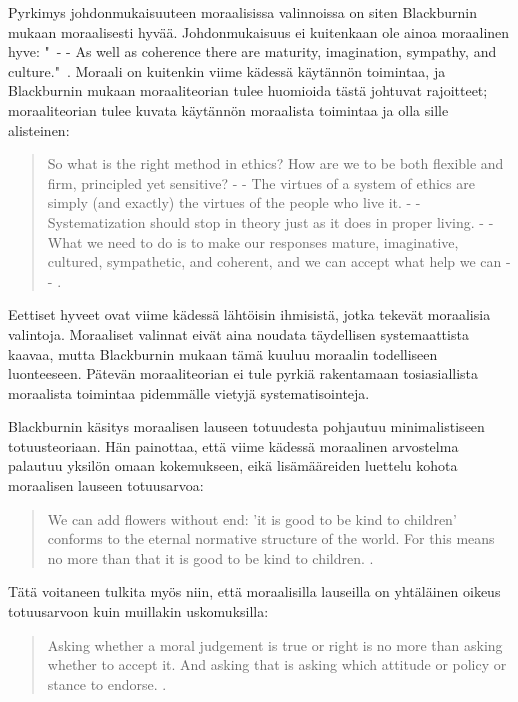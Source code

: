 \documentclass[a4paper,12pt,times,titlepage,finnish]{article}
\begin{document}
Pyrkimys johdonmukaisuuteen moraalisissa valinnoissa on siten Blackburnin mukaan moraalisesti hyvää. Johdonmukaisuus ei kuitenkaan ole ainoa moraalinen hyve: "\ - - As well as coherence there are maturity, imagination, sympathy, and culture."\ \citep[310]{Blackburn98}. 
Moraali on kuitenkin viime kädessä käytännön toimintaa, ja Blackburnin mukaan moraaliteorian tulee huomioida tästä johtuvat rajoitteet; moraaliteorian tulee kuvata käytännön moraalista toimintaa ja olla sille alisteinen:

\begin{quote}

So what is the right method in ethics? How are we to be both flexible and firm, principled yet sensitive? - - The virtues of a system of ethics are simply (and exactly) the virtues of the people who live it. - - Systematization should stop in theory just as it does in proper living. - - What we need to do is to make our responses mature, imaginative, cultured, sympathetic, and coherent, and we can accept what help we can - - \citep[310]{Blackburn98}.

\end{quote}

Eettiset hyveet ovat viime kädessä lähtöisin ihmisistä, jotka tekevät moraalisia valintoja. Moraaliset valinnat eivät aina noudata täydellisen systemaattista kaavaa, mutta Blackburnin mukaan tämä kuuluu moraalin todelliseen luonteeseen. Pätevän moraaliteorian ei tule pyrkiä rakentamaan tosiasiallista moraalista toimintaa pidemmälle vietyjä systematisointeja. 

Blackburnin käsitys moraalisen lauseen totuudesta pohjautuu minimalistiseen totuusteoriaan. Hän painottaa, että viime kädessä moraalinen arvostelma palautuu yksilön omaan kokemukseen, eikä lisämääreiden luettelu kohota moraalisen lauseen totuusarvoa: 

\begin{quote}
 We can add flowers without end: 'it is good to be kind to children' conforms to the eternal normative structure of the world. For this means no more than that it is good to be kind to children. \citep[79]{Blackburn98}. 
\end{quote}

Tätä voitaneen tulkita myös niin, että moraalisilla lauseilla on yhtäläinen oikeus totuusarvoon kuin muillakin uskomuksilla: 

\begin{quote}
 Asking whether a moral judgement is true or right is no more than asking whether to accept it. And asking that is asking which attitude or policy or stance to endorse. \citep[214]{Blackburn99}.
\end{quote}
\end{document}
